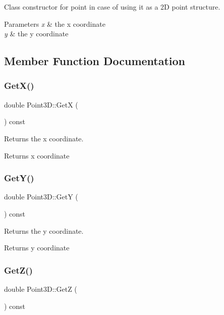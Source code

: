 Class constructor for point in case of using it as a 2D point structure. 
\begin{DoxyParams}{Parameters}
{\em x} & the x coordinate \\
\hline
{\em y} & the y coordinate \\
\hline
\end{DoxyParams}


\subsection{Member Function Documentation}
\hypertarget{class_point3_d_a38cf0869ef4de11a4f02ad65513c1a4e}{}\label{class_point3_d_a38cf0869ef4de11a4f02ad65513c1a4e} 
\subsubsection{\texorpdfstring{Get\+X()}{GetX()}}
{\footnotesize\ttfamily double Point3\+D\+::\+GetX (\begin{DoxyParamCaption}{ }\end{DoxyParamCaption}) const}

Returns the x coordinate. \begin{DoxyReturn}{Returns}
x coordinate 
\end{DoxyReturn}
\hypertarget{class_point3_d_a9e0e1e5926240f6ba9a4676586bd574c}{}\label{class_point3_d_a9e0e1e5926240f6ba9a4676586bd574c} 
\subsubsection{\texorpdfstring{Get\+Y()}{GetY()}}
{\footnotesize\ttfamily double Point3\+D\+::\+GetY (\begin{DoxyParamCaption}{ }\end{DoxyParamCaption}) const}

Returns the y coordinate. \begin{DoxyReturn}{Returns}
y coordinate 
\end{DoxyReturn}
\hypertarget{class_point3_d_af6eb3e13adb7057a54b34a973d430162}{}\label{class_point3_d_af6eb3e13adb7057a54b34a973d430162} 
\subsubsection{\texorpdfstring{Get\+Z()}{GetZ()}}
{\footnotesize\ttfamily double Point3\+D\+::\+GetZ (\begin{DoxyParamCaption}{ }\end{DoxyParamCaption}) const}

